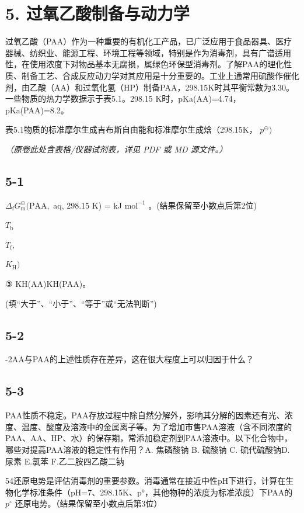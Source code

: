 \section*{5. 过氧乙酸制备与动力学}
过氧乙酸（PAA）作为一种重要的有机化工产品，已广泛应用于食品器具、医疗器械、纺织业、能源工程、环境工程等领域，特别是作为消毒剂，具有广谱适用性，在使用浓度下对物品基本无腐损，属绿色环保型消毒剂。了解PAA的理化性质、制备工艺、合成反应动力学对其应用是十分重要的。工业上通常用硫酸作催化剂，由乙酸（AA）和过氧化氢（HP）制备PAA，298.15K时其平衡常数为3.30。一些物质的热力学数据示于表5.1。298.15 K时，pKa(AA)=4.74，pKa(PAA)=8.2。

表5.1物质的标准摩尔生成吉布斯自由能和标准摩尔生成焓（298.15K， $p ^ { \ominus } )$

\textit{（原卷此处含表格/仪器试剂表，详见 PDF 或 MD 源文件。）}

\subsection*{5-1}
$\Delta _ { \mathrm { f } } G _ { \mathrm { m } } ^ { \ominus } ( \mathrm { P A A } ,$ aq, 298.15 K) = kJ $\mathrm { m o l } ^ { - 1 }$ 。(结果保留至小数点后第2位)

$
T _ {\mathrm{b}}
$

$
T _ {\mathrm{f}},
$

$
K _ {\mathrm{H}})
$

③ KH(AA)KH(PAA)。

(填“大于”、“小于”、“等于”或“无法判断”)

\subsection*{5-2}
-2AA与PAA的上述性质存在差异，这在很大程度上可以归因于什么？

\subsection*{5-3}
PAA性质不稳定。PAA存放过程中除自然分解外，影响其分解的因素还有光、浓度、温度、酸度及溶液中的金属离子等。为了增加市售PAA溶液（含不同浓度的PAA、AA、HP、水）的保存期，常添加稳定剂到PAA溶液中。以下化合物中，哪些对提高PAA溶液的稳定性有作用？A. 焦磷酸钠 B. 硫酸钠 C. 硫代硫酸钠D. 尿素 E.氯苯 F.乙二胺四乙酸二钠

54还原电势是评估消毒剂的重要参数。消毒通常在接近中性pH下进行，计算在生物化学标准条件（pH=7、298.15K、p°，其他物种的浓度为标准浓度）下PAA的 $p ^ { \circ }$ 还原电势。（结果保留至小数点后第3位）

